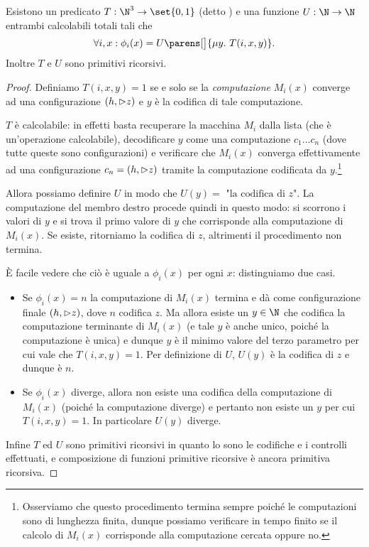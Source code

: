 \begin{theorem}
    Esistono un predicato $T : \N^3 \to \set{0, 1}$ (detto ) e una funzione $U : \N \to \N$ entrambi calcolabili totali tali che \[
        \forall i, x: \phi_i(x) = U\parens[\big]{\mi{y}{T(i, x, y)}}.
    \] Inoltre $T$ e $U$ sono primitivi ricorsivi. 
\end{theorem}
\begin{proof}
    Definiamo $T(i, x, y) = 1$ se e solo se la \emph{computazione} $M_i(x)$ converge ad una configurazione $(h, {\vartriangleright} z)$ e $y$ è la codifica di tale computazione.
    
    $T$ è calcolabile: in effetti basta recuperare la macchina $M_i$ dalla lista (che è un'operazione calcolabile), decodificare $y$ come una computazione $c_1\dots c_n$ (dove tutte queste sono configurazioni) e verificare che $M_i(x)$ converga effettivamente ad una configurazione $c_n = (h, {\vartriangleright} z)$ tramite la computazione codificata da $y$.\footnote{Osserviamo che questo procedimento termina sempre poiché le computazioni sono di lunghezza finita, dunque possiamo verificare in tempo finito se il calcolo di $M_i(x)$ corrisponde alla computazione cercata oppure no.}
    
    Allora possiamo definire $U$ in modo che $U(y) = \text{ "la codifica di } z$". La computazione del membro destro procede quindi in questo modo: si scorrono i valori di $y$ e si trova il primo valore di $y$ che corrisponde alla computazione di $M_i(x)$. Se esiste, ritorniamo la codifica di $z$, altrimenti il procedimento non termina.
    
    È facile vedere che ciò è uguale a $\phi_i(x)$ per ogni $x$: distinguiamo due casi.
    \begin{itemize}
        \item Se $\phi_i(x) = n$ la computazione di $M_i(x)$ termina e dà come configurazione finale $(h, {\vartriangleright} z)$, dove $n$ codifica $z$. Ma allora esiste un $y \in \N$ che codifica la computazione terminante di $M_i(x)$ (e tale $y$ è anche unico, poiché la computazione è unica) e dunque $y$ è il minimo valore del terzo parametro per cui vale che $T(i, x, y) = 1$. Per definizione di $U$, $U(y)$ è la codifica di $z$ e dunque è $n$.
        \item Se $\phi_i(x)$ diverge, allora non esiste una codifica della computazione di $M_i(x)$ (poiché la computazione diverge) e pertanto non esiste un $y$ per cui $T(i, x, y) = 1$. In particolare $U(y)$ diverge.      
    \end{itemize}  

    Infine $T$ ed $U$ sono primitivi ricorsivi in quanto lo sono le codifiche e i controlli effettuati, e composizione di funzioni primitive ricorsive è ancora primitiva ricorsiva.
\end{proof}

